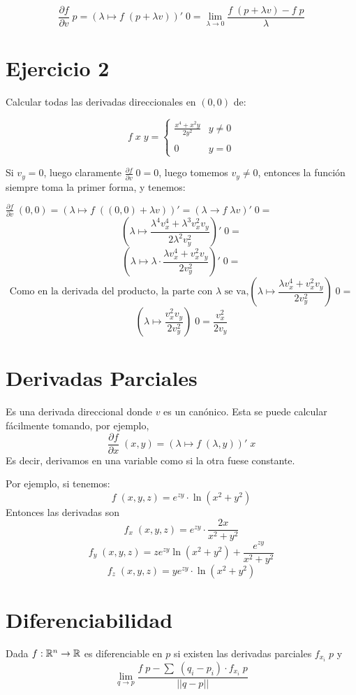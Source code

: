\documentclass{article}
\begin{document}
\[
	\frac{\partial f}{\partial v} \; p = (\lambda \mapsto f\;(p + \lambda v))' \; 0
	= \lim_{\lambda \to 0} \frac{f \; (p + \lambda v) - f \; p}{\lambda} 
\]

\section*{Ejercicio 2}
Calcular todas las derivadas direccionales en $(0, 0)$ de:

\[
	f \; x \; y =
	\begin{cases}
		\frac{x^4 + x^2y}{2y^2} & y \neq 0 \\
		\\
		0 & y = 0
	\end{cases}
\]

Si $v_y = 0$, luego claramente $\frac{\partial f}{\partial v} \; 0 = 0$, luego
tomemos $v_y \neq 0$, entonces la función siempre toma la primer forma, y
tenemos:

$\frac{\partial f}{\partial v} \; (0, 0) = (\lambda \mapsto f \; ((0, 0) +
\lambda v))' = 
(\lambda \to f \; \lambda v)' \; 0 = $
\[\left(\lambda \mapsto
\frac{\lambda^4v_x^4 + \lambda^3v_x^2v_y}{2\lambda^2v_y^2} \right)' \; 0= \]
\[\left(\lambda \mapsto
\lambda \cdot \frac{\lambda v_x^4 + v_x^2v_y}{2v_y^2} \right)' \; 0= \]
\[\text{Como en la derivada del producto, la parte con $\lambda$ se va,}
	\left(\lambda \mapsto
\frac{\lambda v_x^4 + v_x^2v_y}{2v_y^2} \right) \; 0= \]
\[\left(\lambda \mapsto
\frac{v_x^2v_y}{2v_y^2} \right) \; 0= \frac{v_x^2}{2v_y}\]

\section*{Derivadas Parciales}
Es una derivada direccional donde $v$ es un canónico. Esta se puede calcular
fácilmente tomando, por ejemplo,
\[
	\frac{\partial f}{\partial x} \; (x, y) = (\lambda \mapsto f \; (\lambda, y))' \; x
\]
Es decir, derivamos en una variable como si la otra fuese constante.

Por ejemplo, si tenemos:
\[f \; (x, y, z) = e^{zy} \cdot \ln (x^2 + y^2)\]
Entonces las derivadas son
\[f_x \; (x, y, z) = e^{zy} \cdot \frac{2x}{x^2+y^2} \]
\[f_y \; (x, y, z) = z e^{zy} \ln (x^2 + y^2) +
\frac{e^{zy}}{x^2+y^2} \]
\[f_z \; (x, y, z) = ye^{zy} \cdot \ln (x^2 + y^2)\]

\section*{Diferenciabilidad}
Dada $f : \mathbb{R}^n \to \mathbb{R}$ es diferenciable en $p$ si existen las derivadas parciales
$f_{x_i} \; p$ y
\[\lim_{q \to p} \frac{f \; p - \sum \; (q_i - p_i) \cdot f_{x_i} \;
p}{||q - p||} \]
\end{document}
